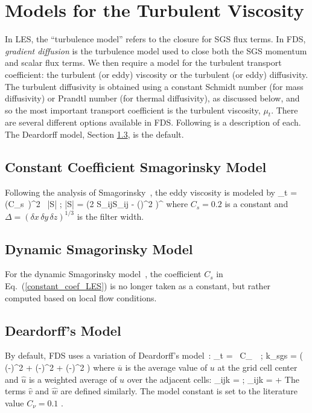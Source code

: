 \section{Models for the Turbulent Viscosity}
\label{section:turbulent_viscosity}

In LES, the ``turbulence model'' refers to the closure for SGS flux terms.  In FDS, \emph{gradient diffusion} is the turbulence model used to close both the SGS momentum and scalar flux terms.  We then require a model for the turbulent transport coefficient: the turbulent (or eddy) viscosity or the turbulent (or eddy) diffusivity.  The turbulent diffusivity is obtained using a constant Schmidt number (for mass diffusivity) or Prandtl number (for thermal diffusivity), as discussed below, and so the most important transport coefficient is the turbulent viscosity, $\mu_t$. There are several different options available in FDS. Following is a description of each. The Deardorff model, Section \ref{sec:deardorff}, is the default.

\subsection{Constant Coefficient Smagorinsky Model}

Following the analysis of Smagorinsky~\cite{Smagorinsky:1}, the eddy viscosity is modeled by
\be
\mu_t = \rho \, (C_s\, \Delta)^2 \, |S| \label{constant_coef_LES} \quad ; \quad |S| = \left(2 S_{ij}S_{ij} -  (\nabla\!\cdot \bu)^2 \right)^\ha
\ee
where $C_s=0.2$ is a constant and $\Delta = (\delta x \, \delta y \, \delta z)^{1/3}$ is the filter width.

\subsection{Dynamic Smagorinsky Model}

For the dynamic Smagorinsky model~\cite{Germano:1}, the coefficient $C_s$ in Eq.~(\ref{constant_coef_LES}) is no longer taken as a constant, but rather computed based on local flow conditions. 

\subsection{Deardorff's Model}
\label{sec:deardorff}

By default, FDS uses a variation of Deardorff's model~\cite{Deardorff:1}:
\be
  \mu_t = \rho \, C_\nu \, \Delta \,  \quad ; \quad
  k_{\hbox{\tiny sgs}} = \ha \left( (-)^2 + (-)^2 + (-)^2 \right)  \label{Deardorff_LES}
\ee
where $\overline{u}$ is the average value of $u$ at the grid cell center and $\hat{u}$ is a weighted average of $u$ over the adjacent cells:
\be
   _{ijk} =  \quad ; \quad {}_{ijk} =  + 
\ee
The terms $\hat{v}$ and $\hat{w}$ are defined similarly.  The model constant is set to the literature value $C_\nu=0.1$ \cite{Pope:2000}.

